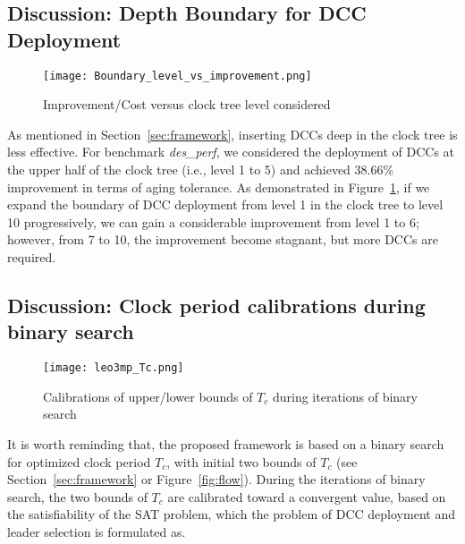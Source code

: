 \subsection{Discussion: Depth Boundary for DCC Deployment}
\begin{figure}
    \centering
    \texttt{[image: Boundary\_level\_vs\_improvement.png]} %
    \caption{Improvement/Cost versus clock tree level considered}
    \label{fig:boundary}
\end{figure}

As mentioned in Section~\ref{sec:framework}, inserting DCCs deep in the clock tree is less effective. For benchmark \textit{des\_perf}, we considered the deployment of DCCs at the upper half of the clock tree (i.e., level 1 to 5) and achieved 38.66\% improvement in terms of aging tolerance. As demonstrated in Figure~\ref{fig:boundary}, if we expand the boundary of DCC deployment from level 1 in the clock tree to level 10 progressively, we can gain a considerable improvement from level 1 to 6; however, from 7 to 10, the improvement become stagnant, but more DCCs are required.


\subsection{Discussion: Clock period calibrations during binary search}
\begin{figure}
    \centering
    \texttt{[image: leo3mp\_Tc.png]} %
    \caption{Calibrations of upper/lower bounds of $T_{c}$ during iterations of binary search}
    \label{fig:Tc}
\end{figure}

It is worth reminding that, the proposed framework is based on a binary search for optimized clock period $T_{c}$, with initial two bounds of $T_{c}$ (see Section~\ref{sec:framework} or Figure~\ref{fig:flow}). During the iterations of binary search, the two bounds of $T_{c}$ are calibrated toward a convergent value, based on the satisfiability of the SAT problem, which the problem of DCC deployment and leader selection is formulated as.

